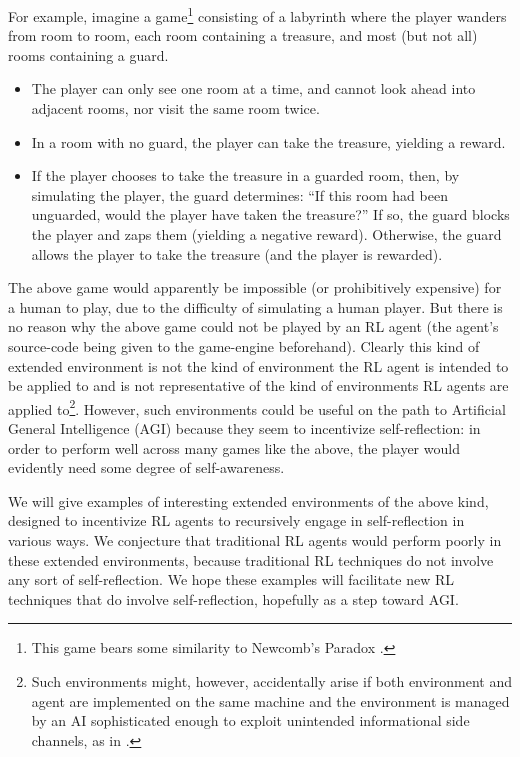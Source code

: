 \documentclass[runningheads]{llncs}
\begin{document}
For example, imagine a game\footnote{This game bears some similarity to Newcomb's
Paradox \cite{nozick1969newcomb}.} consisting of a
labyrinth where the player wanders from
room to room, each room containing a treasure, and most (but not all) rooms containing
a guard.
\begin{itemize}
    \item
    The player can only see one room at a time, and cannot look ahead into adjacent
    rooms, nor visit the same room twice.
    \item
    In a room with no guard, the player can take the treasure, yielding a reward.
    \item
    If the player chooses to take the treasure in a guarded room,
    then, by simulating the player, the guard determines: ``If
    this room had been unguarded, would the player have taken the treasure?''
    If so, the guard blocks the player and zaps them (yielding a negative reward).
    Otherwise, the guard allows the player to take the treasure (and the player is rewarded).
\end{itemize}

The above game would apparently be impossible (or prohibitively expensive)
for a human to play, due to the difficulty of simulating a human player.
But there is no reason why the above game could not be played by an RL agent (the
agent's source-code being given to the game-engine beforehand). Clearly this kind of
extended environment is not the kind of environment the RL agent is intended to be
applied to and is not representative of the kind of environments RL agents are
applied to\footnote{Such environments might, however, accidentally arise if both environment
and agent are implemented on the same machine and the environment is managed by an AI
sophisticated enough to exploit unintended informational side channels, as in
\cite{yampolskiy2012leakproofing}.}. However, such environments could be
useful on the path to Artificial
General Intelligence (AGI) because they seem to incentivize self-reflection: in order
to perform well across many games like the above, the player would evidently need
some degree of self-awareness.

We will give examples of interesting
extended environments of the above kind, designed to incentivize RL agents to
recursively engage in self-reflection in various ways.
We conjecture that traditional RL agents would perform poorly in these extended
environments, because traditional RL techniques do not involve any sort of
self-reflection. We hope these examples will facilitate
new RL techniques that do involve self-reflection, hopefully as a step toward AGI.
\end{document}
